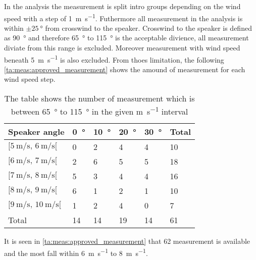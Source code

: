 
In the analysis the measurement is split intro groups depending on the wind speed with a step of \SI{1}{\meter\per\second}. Futhermore all measurement in the analysis is within $\pm\SI{25}{\degree}$ from crosswind to the speaker. Crosswind to the speaker is defined as \SI{90}{\degree} and therefore \SI{65}{\degree} to \SI{115}{\degree} is the acceptable divience, all measurement diviate from this range is excluded. Moreover measurement with wind speed beneath \SI{5}{\meter\per\second} is also excluded. From thoes limitation, the following \autoref{ta:meas:approved_measurement} shows the amound of measurement for each wind speed step. 

\begin{table}[H]
\centering
\caption{The table shows the number of measurement which is between \SI{65}{\degree} to \SI{115}{\degree} in the given \si{\meter\per\second} interval}
\begin{tabular}{l|l|l|l|l|l}
Speaker angle & \SI{0}{\degree}  & \SI{10}{\degree} & \SI{20}{\degree} & \SI{30}{\degree} & Total \\ \hline
$[\SI{5}{\meter\per\second},\, \SI{6}{\meter\per\second}[ $         & 0  & 2  & 4  & 4  & 10    \\
$[\SI{6}{\meter\per\second},\, \SI{7}{\meter\per\second}[$           & 2  & 6  & 5  & 5  & 18    \\
$[\SI{7}{\meter\per\second},\, \SI{8}{\meter\per\second}[ $          & 5  & 3  & 4  & 4  & 16    \\
$[\SI{8}{\meter\per\second},\, \SI{9}{\meter\per\second}[ $          & 6  & 1  & 2  & 1  & 10    \\
$[\SI{9}{\meter\per\second},\, \SI{10}{\meter\per\second}[  $        & 1  & 2  & 4  & 0  & 7     \\ \hline
Total         & 14 & 14 & 19 & 14 &   61   
\end{tabular}
\label{ta:meas:approved_measurement}
\end{table}

It is seen in \autoref{ta:meas:approved_measurement} that 62 measurement is available and the most fall within \SI{6}{\meter\per\second} to \SI{8}{\meter\per\second}.


